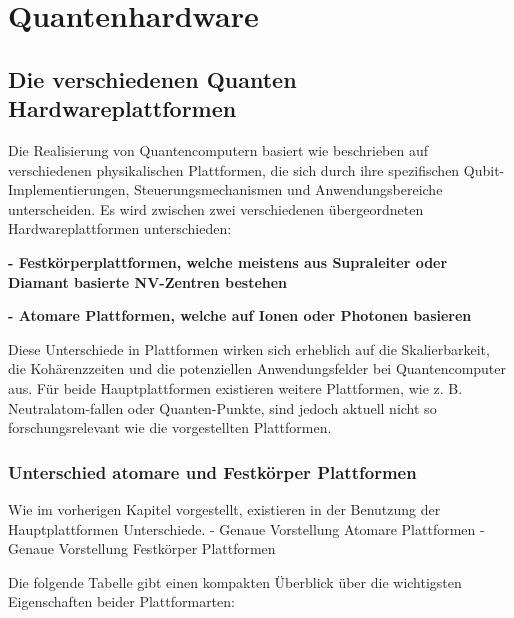 

\chapter{Quantenhardware}
\label{hardware} %



\section{Die verschiedenen Quanten Hardwareplattformen}
Die Realisierung von Quantencomputern basiert wie beschrieben auf verschiedenen physikalischen Plattformen, die sich durch ihre spezifischen Qubit-Implementierungen, Steuerungsmechanismen und Anwendungsbereiche unterscheiden. Es wird zwischen zwei verschiedenen übergeordneten Hardwareplattformen unterschieden:


\textbf{    - Festkörperplattformen, welche meistens aus Supraleiter oder Diamant basierte NV-Zentren bestehen } 

\textbf{    - Atomare Plattformen, welche auf Ionen oder Photonen basieren} 

Diese Unterschiede in Plattformen wirken sich erheblich auf die Skalierbarkeit, die Kohärenzzeiten und die potenziellen Anwendungsfelder bei Quantencomputer aus. Für beide Hauptplattformen existieren weitere Plattformen, wie z. B. Neutralatom-fallen oder Quanten-Punkte, sind jedoch aktuell nicht so forschungsrelevant wie die vorgestellten Plattformen.

\subsection{Unterschied atomare und Festkörper Plattformen}

Wie im vorherigen Kapitel vorgestellt, existieren in der Benutzung der Hauptplattformen Unterschiede.
- Genaue Vorstellung Atomare Plattformen
- Genaue Vorstellung Festkörper Plattformen

Die folgende Tabelle gibt einen kompakten Überblick über die wichtigsten Eigenschaften beider Plattformarten:

